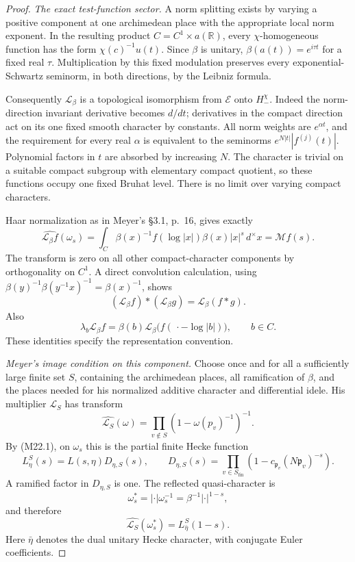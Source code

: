 \begin{proof}
\emph{The exact test-function sector.}
A norm splitting exists by varying a positive component
at one archimedean place with the appropriate local
norm exponent.  In the resulting product
\(C=C^1\times a(\mathbb R)\), every \(\chi\)-homogeneous
function has the form \(\chi(c)^{-1}u(t)\).
Since \(\beta\) is unitary,
\(\beta(a(t))=e^{i\tau t}\) for a fixed real \(\tau\).
Multiplication by this fixed modulation preserves
every exponential-Schwartz seminorm, in both
directions, by the Leibniz formula.

Consequently \(\mathcal L_\beta\) is a topological
isomorphism from \(\mathcal E\) onto \(H_-^\chi\).
Indeed the norm-direction invariant derivative becomes
\(d/dt\); derivatives in the compact direction act
on its one fixed smooth character by constants.
All norm weights are \(e^{\alpha t}\), and the
requirement for every real \(\alpha\) is equivalent
to the seminorms \(e^{N|t|}|f^{(j)}(t)|\).
Polynomial factors in \(t\) are absorbed by increasing
\(N\).  The character is trivial on a suitable
compact subgroup with elementary compact quotient,
so these functions occupy one fixed Bruhat level.
There is no limit over varying compact characters.

Haar normalization as in Meyer's \S3.1, p.~16,
gives exactly
\[
 \widehat{\mathcal L_\beta f}(\omega_s)
       =\int_C\beta(x)^{-1}f(\log|x|)
                      \beta(x)|x|^s\,d^\times x
       =\mathcal Mf(s).                                        \tag{M22.3}
\]
The transform is zero on all other compact-character
components by orthogonality on \(C^1\).
A direct convolution calculation, using
\(\beta(y)^{-1}\beta(y^{-1}x)^{-1}=\beta(x)^{-1}\),
shows
\[
  (\mathcal L_\beta f)*(\mathcal L_\beta g)
                         =\mathcal L_\beta(f*g).
\]
Also
\[
 \lambda_b\mathcal L_\beta f
   =\beta(b)\mathcal L_\beta
         \bigl(f(\,\cdot-\log|b|)\bigr),\qquad b\in C.            \tag{M22.4}
\]
These identities specify the representation convention.

\emph{Meyer's image condition on this component.}
Choose once and for all a sufficiently large finite
set \(S\), containing the archimedean places, all
ramification of \(\beta\), and the places needed for
his normalized additive character and differential
idele.  His multiplier \(\mathcal L_S\) has transform
\[
 \widehat{\mathcal L_S}(\omega)
       =\prod_{v\notin S}(1-\omega(p_v)^{-1})^{-1}.
\]
By (M22.1), on \(\omega_s\) this is the partial finite
Hecke function
\[
 L_\eta^S(s)
       =L(s,\eta)D_{\eta,S}(s),\qquad
 D_{\eta,S}(s)=
        \prod_{v\in S_{\mathrm{fin}}}
             (1-c_{\mathfrak p_v}(N\mathfrak p_v)^{-s}).         \tag{M22.5}
\]
A ramified factor in \(D_{\eta,S}\) is one.
The reflected quasi-character is
\[
 \omega_s^*=|\cdot|\omega_s^{-1}
                    =\beta^{-1}|\cdot|^{1-s},
\]
and therefore
\[
              \widehat{\mathcal L_S}(\omega_s^*)
                       =L_{\bar\eta}^S(1-s).                   \tag{M22.6}
\]
Here \(\bar\eta\) denotes the dual unitary Hecke
character, with conjugate Euler coefficients.


\end{proof}
